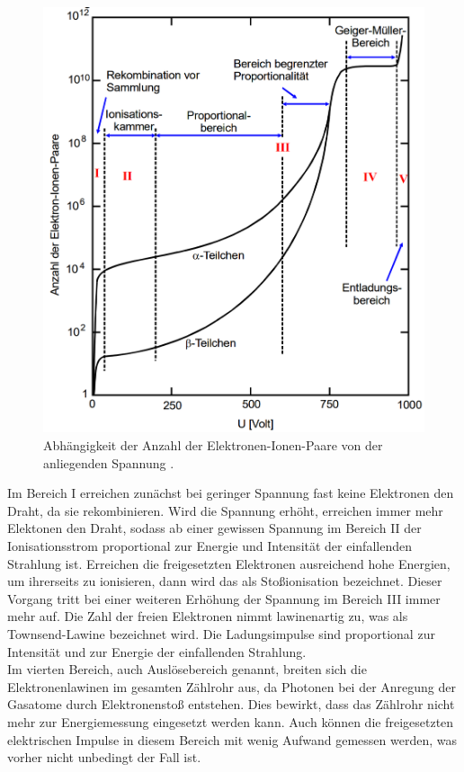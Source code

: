 \begin{figure}
  \centering
  \includegraphics[width=\textwidth]{data/nu.png}
  \caption{Abhängigkeit der Anzahl der Elektronen-Ionen-Paare von der anliegenden Spannung \cite{Versuchsanleitung}.}
  \label{fig:nu}
\end{figure}

Im Bereich I erreichen zunächst bei geringer Spannung fast keine Elektronen den Draht, da sie rekombinieren.
Wird die Spannung erhöht, erreichen immer mehr Elektonen den Draht, sodass ab einer gewissen Spannung
im Bereich II der Ionisationsstrom proportional zur Energie und Intensität der einfallenden Strahlung ist.
Erreichen die freigesetzten Elektronen ausreichend hohe Energien, um ihrerseits zu ionisieren,
dann wird das als Stoßionisation bezeichnet. Dieser Vorgang tritt bei einer weiteren Erhöhung der Spannung im Bereich III immer mehr auf.
Die Zahl der freien Elektronen nimmt lawinenartig zu, was als Townsend-Lawine bezeichnet wird.
Die Ladungsimpulse sind proportional zur Intensität und zur Energie der einfallenden Strahlung.\\
Im vierten Bereich, auch Auslösebereich genannt, breiten sich die Elektronenlawinen
im gesamten Zählrohr aus, da Photonen bei der Anregung der Gasatome durch Elektronenstoß entstehen.
Dies bewirkt, dass das Zählrohr nicht mehr zur Energiemessung eingesetzt werden kann. Auch können die
freigesetzten elektrischen Impulse in diesem Bereich mit wenig Aufwand gemessen werden, was vorher nicht unbedingt der Fall ist.


